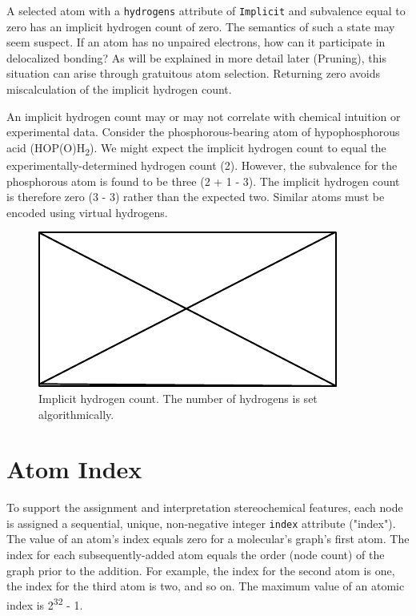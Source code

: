 \documentclass{article}
\def\ttt{\texttt}
\begin{document}
A selected atom with a \ttt{hydrogens} attribute of \ttt{Implicit} and subvalence equal to zero has an implicit hydrogen count of zero. The semantics of such a state may seem suspect. If an atom has no unpaired electrons, how can it participate in delocalized bonding? As will be explained in more detail later (Pruning), this situation can arise through gratuitous atom selection. Returning zero avoids miscalculation of the implicit hydrogen count.

An implicit hydrogen count may or may not correlate with chemical intuition or experimental data. Consider the phosphorous-bearing atom of hypophosphorous acid (HOP(O)H\textsubscript{2}). We might expect the implicit hydrogen count to equal the experimentally-determined hydrogen count (2). However, the subvalence for the phosphorous atom is found to be three (2 + 1 - 3). The implicit hydrogen count is therefore zero (3 - 3) rather than the expected two. Similar atoms must be encoded using virtual hydrogens.

\begin{figure}
    \centering
    \includegraphics{filler}
    \caption{Implicit hydrogen count. The number of hydrogens is set algorithmically.}
    \label{fig:implicit-hydrogen-count}
\end{figure}

\section*{Atom Index}

To support the assignment and interpretation stereochemical features, each node is assigned a sequential, unique, non-negative integer \ttt{index} attribute ("index"). The value of an atom's index equals zero for a molecular's graph's first atom. The index for each subsequently-added atom equals the order (node count) of the graph prior to the addition. For example, the index for the second atom is one, the index for the third atom is two, and so on. The maximum value of an atomic index is 2\textsuperscript{32} - 1.
\end{document}

